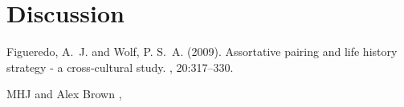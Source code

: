\documentclass[twoside]{article}
\begin{document}

\section{Discussion}



\begin{thebibliography}{99} %

Figueredo, A.~J. and Wolf, P. S.~A. (2009).
\newblock Assortative pairing and life history strategy - a cross-cultural
  study.
, 20:317--330.

 MHJ and Alex Brown
,
 
\end{thebibliography}

\end{document}
